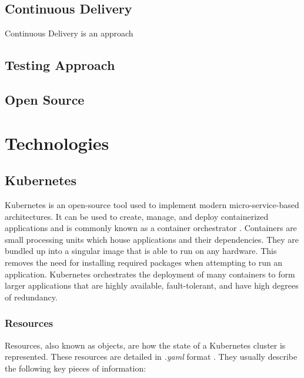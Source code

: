 \documentclass{article}
\begin{document}
 
\subsection{Continuous Delivery} \label{cd}
Continuous Delivery is an approach 



\subsection{Testing Approach}



\subsection{Open Source} \label{open-source}



\section{Technologies} \label{technologies} 



\subsection{Kubernetes}

Kubernetes is an open-source tool used to implement modern micro-service-based architectures. It can be used to create, manage, and deploy containerized applications and is commonly known as a container orchestrator \cite{k8s-overview}. Containers are small processing units which house applications and their dependencies. They are bundled up into a singular image that is able to run on any hardware. This removes the need for installing required packages when attempting to run an application. Kubernetes orchestrates the deployment of many containers to form larger applications that are highly available, fault-tolerant, and have high degrees of redundancy.



\subsubsection{Resources} \label{resources}

Resources, also known as objects, are how the state of a Kubernetes cluster is represented. These resources are detailed in \emph{.yaml} format \cite{k8s-obj}. They usually describe the following key pieces of information:
\end{document}
